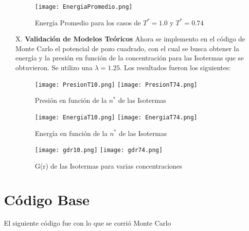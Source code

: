 \documentclass[12pt,letterpaper]{article}
\begin{document}
\begin{enumerate}
\begin{figure}[H]
	\centering 
	\texttt{[image: EnergiaPromedio.png]}
	\caption{Energía Promedio para los casos de $T^*=1.0$ y $T^*=0.74$}
	\label{Fig:EnergiaPromedio}
\end{figure}

\item[X.] \textbf{Validación de Modelos Teóricos} Ahora se implemento en el código de Monte Carlo el potencial de pozo cuadrado, con el cual se busca obtener la energía  y la presión en función de la concentración para las Isotermas que se obtuvieron. Se utilizo una $\lambda = 1.25$. Los resultados fueron los siguientes:

\begin{figure}[H]
	\centering
	\texttt{[image: PresionT10.png]}
	\texttt{[image: PresionT74.png]}
	\caption{Presión en función de la $n^*$ de las Isotermas }
\end{figure}

\begin{figure}[H]
	\centering
	\texttt{[image: EnergiaT10.png]}
	\texttt{[image: EnergiaT74.png]}
	\caption{Energía en función de la $n^*$ de las Isotermas }
\end{figure}
\begin{figure}[H]
	\centering
	\texttt{[image: gdr10.png]}
	\texttt{[image: gdr74.png]}
	\caption{G(r) de las Isotermas para varias concentraciones }
\end{figure}

\end{enumerate}


\section{Código Base}
El siguiente código fue con lo que se corrió Monte Carlo












\end{document}
